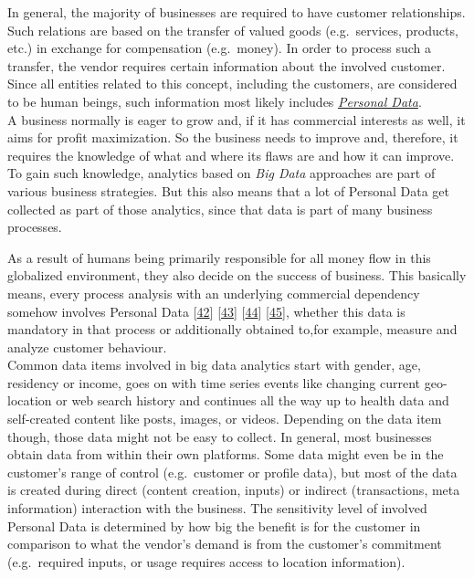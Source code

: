 \documentclass[12pt,english,a4paper,titlepage,cleardoublepage=empty,dottedtoc]{report}
\begin{document}
In general, the majority of businesses are required to have customer
relationships. Such relations are based on the transfer of valued goods
(e.g.~services, products, etc.) in exchange for compensation
(e.g.~money). In order to process such a transfer, the vendor requires
certain information about the involved customer. Since all entities
related to this concept, including the customers, are considered to be
human beings, such information most likely includes
\emph{\protect\hyperlink{digital-identity-personal-data-and-ownership}{Personal
Data}}.\\
A business normally is eager to grow and, if it has commercial interests
as well, it aims for profit maximization. So the business needs to
improve and, therefore, it requires the knowledge of what and where its
flaws are and how it can improve. To gain such knowledge, analytics
based on \emph{Big Data} approaches are part of various business
strategies. But this also means that a lot of Personal Data get
collected as part of those analytics, since that data is part of many
business processes.

As a result of humans being primarily responsible for all money flow in
this globalized environment, they also decide on the success of
business. This basically means, every process analysis with an
underlying commercial dependency somehow involves Personal Data
{[}\protect\hyperlink{ref-web_2016_facebook-utilizes-98-data-points}{42}{]}
{[}\protect\hyperlink{ref-web_2016_big-data-types-of-data-used-in-analytics}{43}{]}
{[}\protect\hyperlink{ref-book-chapter_1999_Principles-of-knowledge-discovery-in-databases_introduction-to-data-mining}{44}{]}
{[}\protect\hyperlink{ref-web_2013_big-data-collection-collides-with-privacy-concerns}{45}{]},
whether this data is mandatory in that process or additionally obtained
to,for example, measure and analyze customer behaviour.\\
Common data items involved in big data analytics start with gender, age,
residency or income, goes on with time series events like changing
current geo-location or web search history and continues all the way up
to health data and self-created content like posts, images, or videos.
Depending on the data item though, those data might not be easy to
collect. In general, most businesses obtain data from within their own
platforms. Some data might even be in the customer's range of control
(e.g.~customer or profile data), but most of the data is created during
direct (content creation, inputs) or indirect (transactions, meta
information) interaction with the business. The sensitivity level of
involved Personal Data is determined by how big the benefit is for the
customer in comparison to what the vendor's demand is from the
customer's commitment (e.g.~required inputs, or usage requires access to
location information).
\end{document}
